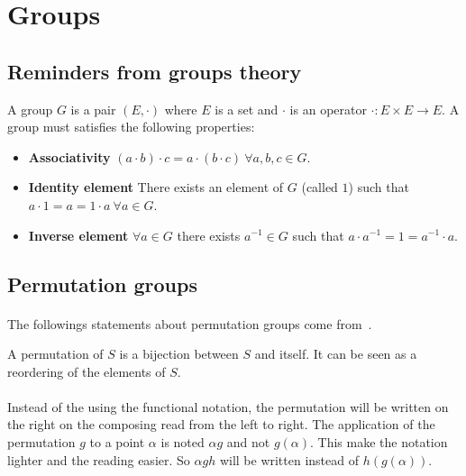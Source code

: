 \section{Groups}

\subsection{Reminders from groups theory}

\begin{definition}[Group]
  A group $G$ is a pair $(E, \cdot)$ where $E$ is a set and $\cdot$ is an operator $\cdot: E \times E \to E$. A group must satisfies the following properties:
  \begin{itemize}
    \item \textbf{Associativity} $(a \cdot b) \cdot c = a \cdot (b \cdot c)\ \forall a,b,c \in G$.
    \item \textbf{Identity element} There exists an element of $G$ (called $1$) such that $a \cdot 1 = a = 1 \cdot a \ \forall a \in G$.
    \item \textbf{Inverse element} $\forall a \in G$ there exists $a^{-1} \in G$ such that $a \cdot a^{-1} = 1 = a^{-1} \cdot a$.
  \end{itemize}
\end{definition}

\subsection{Permutation groups}

\paragraph{}
The followings statements about permutation groups come from~\cite{cameronPermutationGroups}.

\begin{definition}[Permutation]
  A permutation of $S$ is a bijection between $S$ and itself. It can be seen as a reordering of the elements of $S$.
\end{definition}

\paragraph{}
Instead of the using the functional notation, the permutation will be written on the right on the composing read from the left to right. The application of the permutation $g$ to a point $\alpha$ is noted $\alpha g$ and not $g(\alpha)$. This make the notation lighter and the reading easier. So $\alpha gh$ will be written instead of $h(g(\alpha))$.

